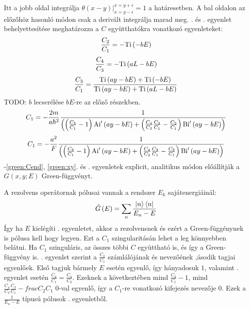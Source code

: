 Itt a jobb oldal integrálja $\left. \theta\left(x - y\right) \right\rvert_{x = y - \epsilon}^{x = y + \epsilon} = 1$ a határesetben. A bal oldalon az előzőhöz hasonló módon csak a derivált integrálja marad meg. . és . egyenlet behelyettesítése meghatározza a $C$ együtthatókra vonatkozó egyenleteket:
\begin{equation}
	\frac{C_2}{C_1} = -\mathrm{Ti}\left(-bE\right)
	\label{green:Cbegin}
\end{equation}
\begin{equation}
	\frac{C_4}{C_3} = -\mathrm{Ti}\left(aL - bE\right)
\end{equation}
\begin{equation}
	\frac{C_3}{C_1} = \frac{\mathrm{Ti}\left(ay - bE\right) + \mathrm{Ti}\left(-bE\right)}{\mathrm{Ti}\left(ay - bE\right) + \mathrm{Ti}\left(aL - bE\right)}
\end{equation}
TODO: $b$ lecserélése $bE$-re az előző részekben.
\begin{equation}
	C_1 = -\frac{2m}{a\hbar^2}\frac{1}{\left( \left(\frac{C_3}{C_1}-1\right)\mathrm{Ai}^\prime\left(ay - bE\right) + \left(\frac{C_4}{C_3}\frac{C_3}{C_1} - \frac{C_2}{C_1}\right) \mathrm{Bi}^\prime\left(ay - bE\right) \right)}
	\label{green:Cend}
\end{equation}
\begin{equation}
	C_1 = -\frac{a^2}{F}\frac{1}{\left( \left(\frac{C_3}{C_1}-1\right)\mathrm{Ai}^\prime\left(ay - bE\right) + \left(\frac{C_4}{C_3}\frac{C_3}{C_1} - \frac{C_2}{C_1}\right) \mathrm{Bi}^\prime\left(ay - bE\right) \right)}
\end{equation}
-\ref{green:Cend}, \ref{green:xy}. és . egyenletek explicit, analitikus módon előállítják a $G\left( x, y; E \right)$ Green-függvényt.

A rezolvens operátornak pólusai vannak a rendszer $E_k$ sajátenergiáinál:
\begin{equation}
	\hat{G}\left(E\right) = \sum_n \frac{\Ket{n}\Bra{n}}{E_n - E}
	\label{green:greensum}
\end{equation}
Így ha $E$ kielégíti . egyenletet, akkor a rezolvensnek és ezért a Green-függénynek is pólusa kell hogy legyen. Ezt a $C_1$ szingularitásán lehet a leg könnyebben belátni. Ha $C_1$ szinguláris, az összes többi $C$ együttható is, és így a Green-függvény is. . egyenlet szerint a $\frac{C_3}{C_1}$ számlálójának és nevezőének ,ásodik tagjai egyenlőek. Első tagjuk bármely $E$ esetén egyenlő, így  hányadosuk $1$, valamint . egyenlet esetén $\frac{C_2}{C_1} = \frac{C_4}{C_3}$. Ezeknek a következtében mind $\frac{C_3}{C_1} - 1$, mind $\frac{C_4}{C_3}\frac{C_3}{C_1} - frac{C_2}{C_1}$ $0$-val egyenlő, így a $C_1$-re vonatkozó kifejezés nevezője $0$. Ezek a $\frac{1}{E_n - E}$ típusú pólusok . egyenletből.


